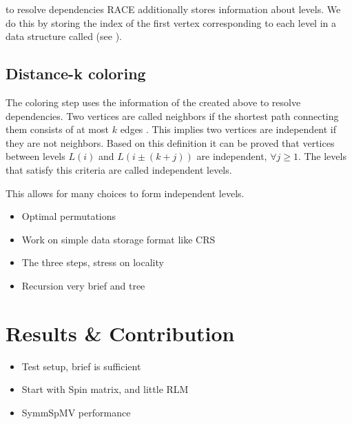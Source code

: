 \Inorder to resolve dependencies \acrshort{RACE} additionally stores information
about levels. We do this by storing the index of the first vertex corresponding
to each level in a data structure called \levelPtr (see ).

\subsection{Distance-k coloring}
The \DK coloring step uses the information of the \levelPtr created above to resolve
dependencies. Two vertices are called \DK neighbors if the shortest path connecting 
them consists of at most $k$ edges \cite{dist_k_def}. This implies two vertices
 are \DK independent if they are not \DK neighbors. Based on this definition
 it can be proved that vertices between levels $L(i)$ and $L(i \pm (k+j))$ are
 \DK independent, $\forall j\ge1$. The levels that satisfy this criteria
 are called \DK independent levels.
 
This allows for many choices to form \DK independent levels.



\begin{itemize}
	\item Optimal permutations
	\item Work on simple data storage format like \acrshort{CRS}
	\item The three steps, stress on locality
	\item Recursion very brief and tree
\end{itemize}


\section{Results \& Contribution} \label{sec:results}
\begin{itemize}
	\item Test setup, brief is sufficient
	\item Start with Spin matrix, and little RLM
	\item SymmSpMV performance
\end{itemize}

